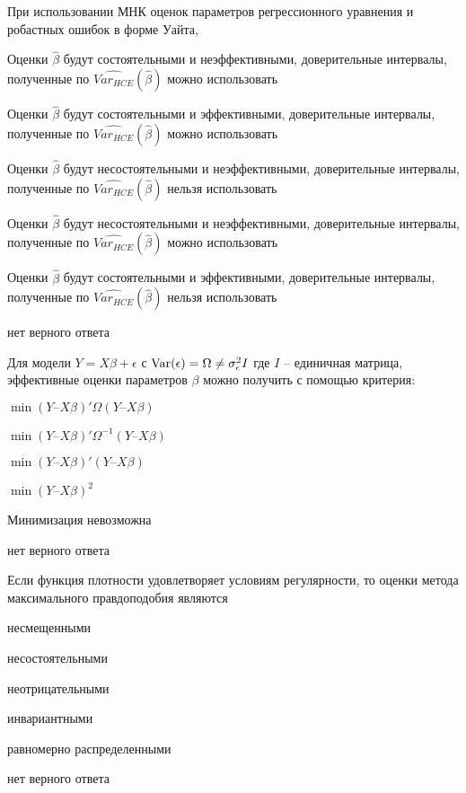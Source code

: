 \begin{question}
При использовании МНК оценок параметров регрессионного уравнения и робастных ошибок в форме Уайта,
\begin{answerlist}
\item Оценки \( \widehat{\beta} \)  будут состоятельными и неэффективными, доверительные интервалы, 
полученные по \( \widehat{Var_{HCE}} (\widehat{\beta}) \) можно использовать
\item Оценки \( \widehat{\beta} \) будут состоятельными и эффективными, доверительные интервалы, 
полученные по  \( \widehat{Var_{HCE}} (\widehat{\beta}) \)  можно использовать
\item Оценки \( \widehat{\beta} \)  будут несостоятельными и неэффективными, доверительные интервалы, 
полученные по  \( \widehat{Var_{HCE}} (\widehat{\beta}) \)   нельзя использовать
\item Оценки \( \widehat{\beta} \)  будут несостоятельными и неэффективными, доверительные интервалы, 
полученные по  \( \widehat{Var_{HCE}} (\widehat{\beta}) \)   можно использовать
\item Оценки \( \widehat{\beta} \)  будут состоятельными и эффективными, доверительные интервалы, 
полученные по  \( \widehat{Var_{HCE}} (\widehat{\beta}) \)   нельзя использовать
\item нет верного ответа
\end{answerlist}
\end{question}

\begin{question}
Для модели \( Y=X\beta + \epsilon \) с \( \operatorname{Var}(\epsilon) = \Omega \neq \sigma_{\epsilon}^{2}I \)
где $I$ – единичная матрица,
эффективные оценки параметров $\beta$ можно получить с помощью критерия:
\begin{answerlist}
\item \( \min (Y – X \beta)' \Omega (Y – X \beta ) \) 
\item \( \min (Y – X \beta)' \Omega^{-1} (Y – X \beta ) \) 
\item \( \min (Y – X \beta)'  (Y – X \beta ) \) 
\item \( \min (Y – X \beta)^2 \) 
\item Минимизация невозможна
\item нет верного ответа
\end{answerlist}
\end{question}

\begin{question}
Если функция плотности удовлетворяет условиям регулярности, 
  то оценки метода максимального правдоподобия являются
\begin{answerlist}
\item несмещенными
\item несостоятельными
\item неотрицательными
\item инвариантными
\item равномерно распределенными
\item нет верного ответа
\end{answerlist}
\end{question}

